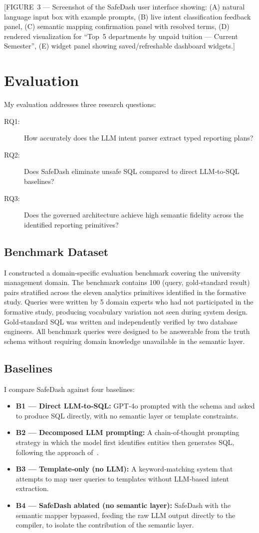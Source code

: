 \documentclass[11pt]{article}
\begin{document}
[FIGURE 3 — Screenshot of the SafeDash user interface showing: (A) natural language input box with example prompts, (B) live intent classification feedback panel, (C) semantic mapping confirmation panel with resolved terms, (D) rendered visualization for ``Top 5 departments by unpaid tuition — Current Semester'', (E) widget panel showing saved/refreshable dashboard widgets.]

\section{Evaluation}
My evaluation addresses three research questions:
\begin{description}
  \item[RQ1:] How accurately does the LLM intent parser extract typed reporting plans?
  \item[RQ2:] Does SafeDash eliminate unsafe SQL compared to direct LLM‑to‑SQL baselines?
  \item[RQ3:] Does the governed architecture achieve high semantic fidelity across the identified reporting primitives?
\end{description}

\subsection{Benchmark Dataset}
I constructed a domain‑specific evaluation benchmark covering the university management domain. The benchmark contains 100 (query, gold‑standard result) pairs stratified across the eleven analytics primitives identified in the formative study. Queries were written by 5 domain experts who had not participated in the formative study, producing vocabulary variation not seen during system design. Gold‑standard SQL was written and independently verified by two database engineers. All benchmark queries were designed to be answerable from the truth schema without requiring domain knowledge unavailable in the semantic layer.

\subsection{Baselines}
I compare SafeDash against four baselines:
\begin{itemize}
  \item \textbf{B1 — Direct LLM‑to‑SQL:} GPT‑4o prompted with the schema and asked to produce SQL directly, with no semantic layer or template constraints.
  \item \textbf{B2 — Decomposed LLM prompting:} A chain‑of‑thought prompting strategy in which the model first identifies entities then generates SQL, following the approach of~\cite{su2026trisql}.
  \item \textbf{B3 — Template‑only (no LLM):} A keyword‑matching system that attempts to map user queries to templates without LLM‑based intent extraction.
  \item \textbf{B4 — SafeDash ablated (no semantic layer):} SafeDash with the semantic mapper bypassed, feeding the raw LLM output directly to the compiler, to isolate the contribution of the semantic layer.
\end{itemize}
\end{document}
